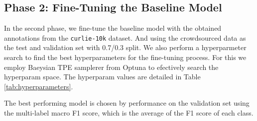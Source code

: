 \subsection* {Phase 2: Fine-Tuning the Baseline Model}
In the second phase, we fine-tune the baseline model with the obtained annotations from the \texttt{curlie-10k} dataset. And using the crowdsourced data as the test and validation set with 0.7/0.3 split.
We also perform a hyperparmeter search to find the best hyperparameters for the fine-tuning process. 
For this we employ Baeysian TPE samplerer from Optuna \cite{optuna} to efectively search the hyperparam space. 
The hyperparam values are detailed in Table \ref{tab:hyperparameters}.


The best performing model is chosen by performance on the validation set using the multi-label macro F1 score, which is the average of the F1 score of each class.

